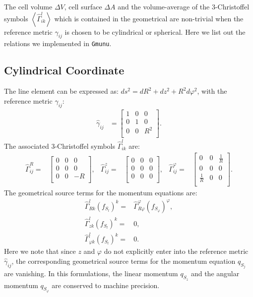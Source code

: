 The cell volume $\Delta V$, cell surface $\Delta A$ and the volume-average of the 3-Christoffel symbols $\left< \hat{\Gamma}^l_{ik}\right>$ which is contained in the geometrical are non-trivial when the reference metric $\hat{\gamma}_{ij}$ is chosen to be cylindrical or spherical.
Here we list out the relations we implemented in \texttt{Gmunu}.
\subsection*{Cylindrical Coordinate}
The line element can be expressed as: $ ds^2 = dR^2 + dz^2 + R^2 d\varphi^2 $, with the reference metric $\hat{\gamma}_{ij}$:
\begin{align}
	\hat{\gamma}_{ij} &= \begin{bmatrix}
		1 & 0 & 0 \\
		0 & 1 & 0 \\
		0 & 0 & R^2 \\
       	\end{bmatrix}.
\end{align}
The associated 3-Christoffel symbols $\hat{\Gamma}^l_{ik}$ are:
\begin{align}
	\hat{\Gamma}^R_{ij} = &\begin{bmatrix}
		0 & 0 & 0 \\
		0 & 0 & 0 \\
		0 & 0 & -R \\
       	\end{bmatrix}, &
	\hat{\Gamma}^z_{ij} = &\begin{bmatrix}
		0 & 0 & 0 \\
		0 & 0 & 0 \\
		0 & 0 & 0 \\
       	\end{bmatrix}, &
	\hat{\Gamma}^\varphi_{ij} = &\begin{bmatrix}
		0  & 0& \frac{1}{R} \\
		0 & 0 & 0 \\
		\frac{1}{R} & 0 & 0 \\
       	\end{bmatrix}.
\end{align}
The geometrical source terms for the momentum equations are:
\begin{align}
\hat{\Gamma}^l_{Rk}(f_{S_l})^k =& \hat{\Gamma}^\varphi_{R\varphi}(f_{S_\varphi})^\varphi ,\\
\hat{\Gamma}^l_{zk}(f_{S_l})^k  =& 0  ,\\
\hat{\Gamma}^l_{\varphi k }(f_{S_l})^k =& 0 .
\end{align}
Here we note that since $z$ and $\varphi$ do not explicitly enter into the reference metric $\hat{\gamma}_{ij}$, the corresponding geometrical source terms for the momentum equation $q_{S_j}$ are vanishing. 
In this formulations, the linear momentum $q_{S_z}$ and the angular momentum $q_{S_\varphi}$ are conserved to machine precision.

